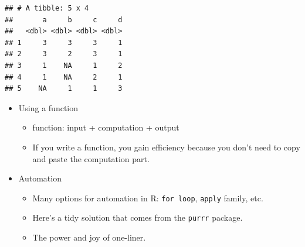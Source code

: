 \documentclass[
]{book}
\newenvironment{Shaded}{\begin{snugshade}}{\end{snugshade}}
\newcommand{\CommentTok}[1]{\textcolor[rgb]{0.56,0.35,0.01}{\textit{#1}}}
\newcommand{\ConstantTok}[1]{\textcolor[rgb]{0.56,0.35,0.01}{#1}}
\newcommand{\ControlFlowTok}[1]{\textcolor[rgb]{0.13,0.29,0.53}{\textbf{#1}}}
\newcommand{\DecValTok}[1]{\textcolor[rgb]{0.00,0.00,0.81}{#1}}
\newcommand{\FunctionTok}[1]{\textcolor[rgb]{0.13,0.29,0.53}{\textbf{#1}}}
\newcommand{\NormalTok}[1]{#1}
\newcommand{\OtherTok}[1]{\textcolor[rgb]{0.56,0.35,0.01}{#1}}
\newcommand{\SpecialCharTok}[1]{\textcolor[rgb]{0.81,0.36,0.00}{\textbf{#1}}}
\providecommand{\tightlist}{%
  \setlength{\itemsep}{0pt}\setlength{\parskip}{0pt}}
\begin{document}
\begin{verbatim}
## # A tibble: 5 x 4
##       a     b     c     d
##   <dbl> <dbl> <dbl> <dbl>
## 1     3     3     3     1
## 2     3     2     3     1
## 3     1    NA     1     2
## 4     1    NA     2     1
## 5    NA     1     1     3
\end{verbatim}

\begin{itemize}
\tightlist
\item
  Using a function

  \begin{itemize}
  \tightlist
  \item
    function: input + computation + output
  \item
    If you write a function, you gain efficiency because you don't need to copy and paste the computation part.
  \end{itemize}
\end{itemize}

\begin{Shaded}
\end{Shaded}

\begin{itemize}
\tightlist
\item
  Automation

  \begin{itemize}
  \tightlist
  \item
    Many options for automation in R: \texttt{for\ loop}, \texttt{apply} family, etc.
  \item
    Here's a tidy solution that comes from the \texttt{purrr} package.
  \item
    The power and joy of one-liner.
  \end{itemize}
\end{itemize}
\end{document}
